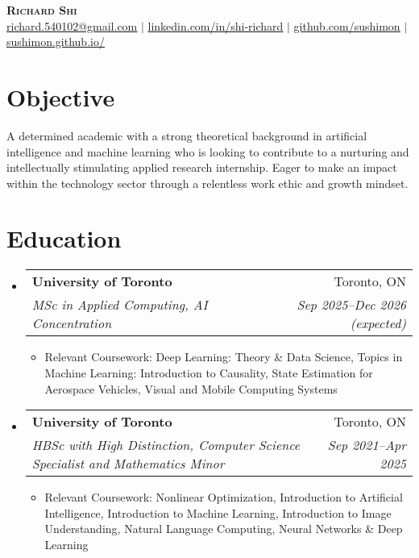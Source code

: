\documentclass[letterpaper,11pt]{article}
\makeatletter
\newcommand{\resumeItem}[1]{
  \item\small{
    {#1 \vspace{-2pt}}
  }
}
\newcommand{\resumeSubheading}[4]{
  \vspace{-2pt}\item
    \begin{tabular*}{0.97\textwidth}[t]{l@{\extracolsep{\fill}}r}
      \textbf{#1} & #2 \\
      \textit{\small#3} & \textit{\small #4} \\
    \end{tabular*}\vspace{-7pt}
}
\newcommand{\resumeSubHeadingListStart}{\begin{itemize}[leftmargin=0.15in, label={}]}
\newcommand{\resumeSubHeadingListEnd}{\end{itemize}}
\newcommand{\resumeItemListStart}{\begin{itemize}}
\newcommand{\resumeItemListEnd}{\end{itemize}\vspace{-5pt}}
\makeatother
\begin{document}

\begin{center}
    \textbf{\Huge \scshape Richard Shi} \\ \vspace{1pt}
    \small \href{mailto:richard.540102@gmail.com}{\underline{richard.540102@gmail.com}} $|$ 
    \href{https://www.linkedin.com/in/shi-richard/}{\underline{linkedin.com/in/shi-richard}} $|$
    \href{https://github.com/sushimon}{\underline{github.com/sushimon}}
    $|$ \href{https://sushimon.github.io/}{\underline{sushimon.github.io/}}
\end{center}


\section{Objective}
  \begin{adjustwidth}{0.15in}{}
    \parbox{0.97\textwidth}{A determined academic with a strong theoretical background in artificial intelligence and machine learning who is looking to contribute to a nurturing and intellectually stimulating applied research internship. Eager to make an impact within the technology sector through a relentless work ethic and growth mindset.}
  \end{adjustwidth}


\section{Education}
  \resumeSubHeadingListStart
      \resumeSubheading{University of Toronto}{Toronto, ON}{MSc in Applied Computing, AI Concentration}{Sep 2025--Dec 2026 (expected)}
      \resumeItemListStart
        \resumeItem{Relevant Coursework: Deep Learning: Theory \& Data Science, Topics in Machine Learning: Introduction to Causality, State Estimation for Aerospace Vehicles, Visual and Mobile Computing Systems }
      \resumeItemListEnd

      \resumeSubheading{University of Toronto}{Toronto, ON}{HBSc with High Distinction, Computer Science Specialist and Mathematics Minor}{Sep 2021--Apr 2025}
      \resumeItemListStart
        \resumeItem{Relevant Coursework: Nonlinear Optimization, Introduction to Artificial Intelligence, Introduction to Machine Learning, Introduction to Image Understanding, Natural Language Computing, Neural Networks \& Deep Learning}
      \resumeItemListEnd
  \resumeSubHeadingListEnd
\end{document}
